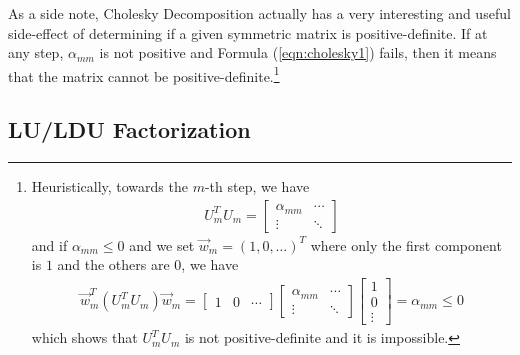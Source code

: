 As a side note, Cholesky Decomposition actually has a very interesting and useful side-effect of determining if a given symmetric matrix is positive-definite. If at any step, $\alpha_{mm}$ is not positive and Formula (\ref{eqn:cholesky1}) fails, then it means that the matrix cannot be positive-definite.\footnote{Heuristically, towards the $m$-th step, we have
\begin{align*}
U_{m}^T U_{m}= 
\begin{bmatrix}
\alpha_{mm} & \cdots \\
\vdots & \ddots
\end{bmatrix}
\end{align*}
and if $\alpha_{mm} \leq 0$ and we set $\vec{w}_{m} = (1,0,\ldots)^T$ where only the first component is $1$ and the others are $0$, we have
\begin{align*}
\vec{w}_{m}^T(U_m^T U_m)\vec{w}_{m} =
\begin{bmatrix}
1 & 0 & \cdots 
\end{bmatrix}
\begin{bmatrix}
\alpha_{mm} & \cdots \\
\vdots & \ddots
\end{bmatrix}
\begin{bmatrix}
1 \\
0 \\
\vdots
\end{bmatrix}
= \alpha_{mm} \leq 0
\end{align*}
which shows that $U_{m}^T U_{m}$ is not positive-definite and it is impossible.}

\subsection{LU/LDU Factorization}

